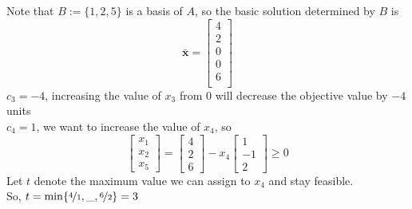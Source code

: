 Note that $B:=\{1,2,5\}$ is a basis of $A$, so the basic solution determined by $B$ is
\[\mathbf{\bar{x}}=
    \begin{bmatrix}
        4\\
        2\\
        0\\
        0\\
        6\\
    \end{bmatrix}
\]
$c_3=-4$, increasing the value of $x_3$ from $0$ will decrease the objective value by $-4$ units\\
$c_4=1$, we want to increase the value of $x_4$, so
\[
    \begin{bmatrix}
        x_1\\
        x_2\\
        x_5
    \end{bmatrix}
    =
    \begin{bmatrix}
        4\\
        2\\
        6
    \end{bmatrix}
    -x_4
    \begin{bmatrix}
        1\\
        -1\\
        2
    \end{bmatrix}
    \ge 0
\]
Let $t$ denote the maximum value we can assign to $x_4$ and stay feasible.\\
So,
$t=\min\{\nicefrac{4}{1},\_,\nicefrac{6}{2}\}=3$

